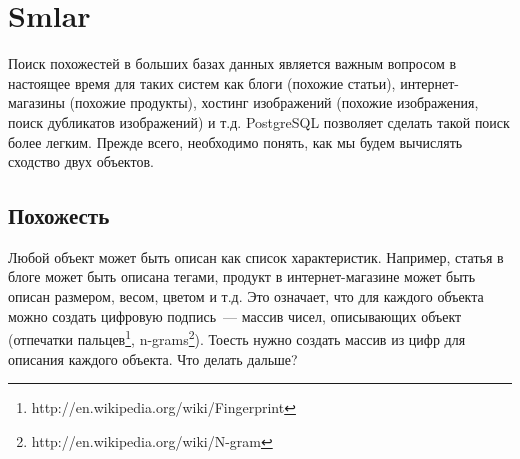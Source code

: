 \section{Smlar}

Поиск похожестей в больших базах данных является важным вопросом в настоящее время для таких систем как блоги (похожие статьи), интернет-магазины (похожие продукты), хостинг изображений (похожие изображения, поиск дубликатов изображений) и т.д. PostgreSQL позволяет сделать такой поиск более легким. Прежде всего, необходимо понять, как мы будем вычислять сходство двух объектов.

\subsection{Похожесть}

Любой объект может быть описан как список характеристик. Например, статья в блоге может быть описана тегами, продукт в интернет-магазине может быть описан размером, весом, цветом и т.д. Это означает, что для каждого объекта можно создать цифровую подпись~--- массив чисел, описывающих объект (отпечатки пальцев\footnote{http://en.wikipedia.org/wiki/Fingerprint}, n-grams\footnote{http://en.wikipedia.org/wiki/N-gram}). Тоесть нужно создать массив из цифр для описания каждого объекта. Что делать дальше?